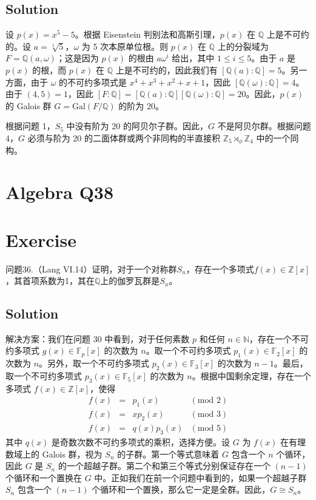 \documentclass[12pt]{book}
\begin{document}
\subsection*{Solution}
设 $p(x) = x^5 - 5$。根据 Eisenstein 判别法和高斯引理，$p(x)$ 在 $\mathbb{Q}$ 上是不可约的。设 $a = \sqrt[5]{5}$，$\omega$ 为 5 次本原单位根。则 $p(x)$ 在 $\mathbb{Q}$ 上的分裂域为 $F = \mathbb{Q}(a,\omega)$；这是因为 $p(x)$ 的根由 $a\omega^i$ 给出，其中 $1 \le i \le 5$。由于 $a$ 是 $p(x)$ 的根，而 $p(x)$ 在 $\mathbb{Q}$ 上是不可约的，因此我们有 $[\mathbb{Q}(a): \mathbb{Q}] = 5$。另一方面，由于 $\omega$ 的不可约多项式是 $x^4+x^3+x^2+x+1$，因此 $[\mathbb{Q}(\omega) : \mathbb{Q}] = 4$。由于 $(4,5) = 1$，因此 $[F: \mathbb{Q}] = [\mathbb{Q}(a) : \mathbb{Q}][\mathbb{Q}(\omega) : \mathbb{Q}] = 20$。因此，$p(x)$ 的 Galois 群 $G = \text{Gal}(F/\mathbb{Q})$ 的阶为 20。

根据问题 1，$S_5$ 中没有阶为 20 的阿贝尔子群。因此，$G$ 不是阿贝尔群。根据问题 4，$G$ 必须与阶为 20 的二面体群或两个非同构的半直接积 $\mathbb{Z}_5 \rtimes_\phi \mathbb{Z}_4$ 中的一个同构。
\newpage
\section{Algebra Q38}
\section*{Exercise}
问题36.（Lang VI.14）证明，对于一个对称群$S_n$，存在一个多项式$f(x) \in \mathbb{Z}[x]$，其首项系数为1，其在$\mathbb{Q}$上的伽罗瓦群是$S_n$。



\subsection*{Solution}
解决方案：我们在问题 30 中看到，对于任何素数 $p$ 和任何 $n \in \mathbb{N}$，存在一个不可约多项式 $g(x) \in \mathbb{F}_p[x]$ 的次数为 $n$。取一个不可约多项式 $p_1(x) \in \mathbb{F}_2[x]$ 的次数为 $n$。另外，取一个不可约多项式 $p_2(x) \in \mathbb{F}_3[x]$ 的次数为 $n-1$。最后，取一个不可约多项式 $p_3(x) \in \mathbb{F}_5[x]$ 的次数为 $n$。根据中国剩余定理，存在一个多项式 $f(x) \in \mathbb{Z}[x]$，使得
\[
\begin{array}{rcll}
f(x) & = & p_1(x) & (\text{mod } 2) \\
f(x) & = & xp_2(x) & (\text{mod } 3) \\
f(x) & = & q(x)p_3(x) & (\text{mod } 5)
\end{array}
\]
其中 $q(x)$ 是奇数次数不可约多项式的乘积，选择方便。设 $G$ 为 $f(x)$ 在有理数域上的 Galois 群，视为 $S_n$ 的子群。第一个等式意味着 $G$ 包含一个 $n$ 个循环，因此 $G$ 是 $S_n$ 的一个超越子群。第二个和第三个等式分别保证存在一个 $(n-1)$ 个循环和一个置换在 $G$ 中。正如我们在前一个问题中看到的，如果一个超越子群 $S_n$ 包含一个 $(n-1)$ 个循环和一个置换，那么它一定是全群。因此，$G \cong S_n$。
\newpage
\end{document}
